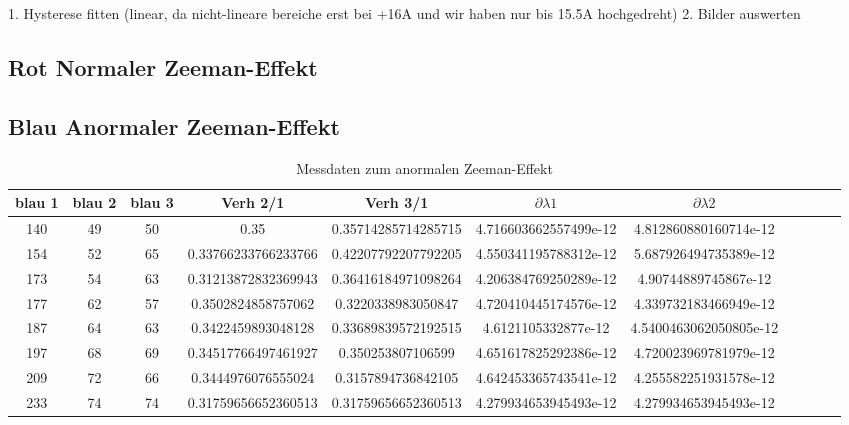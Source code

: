 1. Hysterese fitten (linear, da nicht-lineare bereiche erst bei +16A und wir haben nur bis 15.5A hochgedreht)
2. Bilder auswerten




\subsection{Rot Normaler Zeeman-Effekt}

\subsection{Blau Anormaler Zeeman-Effekt}

\begin{table}[h!]
  \centering
  \caption{Messdaten zum anormalen Zeeman-Effekt}
  \label{tab:blau}
  \begin{tabular}{c c c c c c c c c c c}
    \toprule
      blau 1 & blau 2 & blau 3 & Verh 2/1 & Verh 3/1  & $\partial \lambda 1$ & $\partial \lambda 2$\\
      \midrule
      140   &   49    &   50    &   0.35                  &     0.35714285714285715     &   4.716603662557499e-12   & 4.812860880160714e-12    \\
      154   &   52    &   65    &   0.33766233766233766   &     0.42207792207792205     &   4.550341195788312e-12   & 5.687926494735389e-12    \\
      173   &   54    &   63    &   0.31213872832369943   &     0.36416184971098264     &   4.206384769250289e-12   & 4.90744889745867e-12     \\
      177   &   62    &   57    &   0.3502824858757062    &     0.3220338983050847      &   4.720410445174576e-12   & 4.339732183466949e-12    \\
      187   &   64    &   63    &   0.3422459893048128    &     0.33689839572192515     &   4.6121105332877e-12     & 4.5400463062050805e-12   \\
      197   &   68    &   69    &   0.34517766497461927   &     0.350253807106599       &   4.651617825292386e-12   & 4.720023969781979e-12    \\
      209   &   72    &   66    &   0.3444976076555024    &     0.3157894736842105      &   4.642453365743541e-12   & 4.255582251931578e-12    \\
      233   &   74    &   74    &   0.31759656652360513   &     0.31759656652360513     &   4.279934653945493e-12   & 4.279934653945493e-12    \\

\end{tabular}
\end{table}

